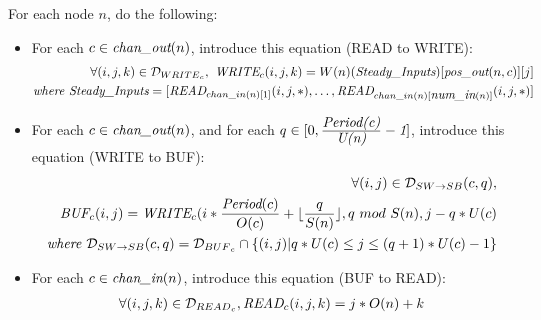 \noindent For each node $n$, do the following:
\begin{itemize}

\item For each $c \in \mbox{\it chan\_out}(n)$, introduce this equation
(READ to WRITE):
%
\begin{align*}
\forall (i, j, k) \in {\cal D}_{{WRITE}_{c}},~\mbox{\it WRITE}_{c}(i,j,k) = W(n)(\mbox{\it Steady\_Inputs})[\mbox{\it pos\_out}(n, c)][j] \\
\mbox{\it where Steady\_Inputs} = [\mbox{\it READ}_{{chan\_in}(n)[1]}(i, j, *), \dots, 
                             \mbox{\it READ}_{{chan\_in}(n)[\mbox{\it num\_in}(n)]}(i, j, *) ]
\end{align*}
%
\item For each $c \in \mbox{\it chan\_out}(n)$, and for each $q \in
[0,\frac{\mbox{\it Period(c)}}{\mbox{\it U(n)}}-\mbox{\it 1}]$,
introduce this equation (WRITE to BUF):
\begin{align*}
\forall (i,j) \in {\cal D}_{SW {\small \rightarrow} SB}(c,q), \\
\mbox{\it BUF}_{c}(i,j) = 
  \mbox{\it WRITE}_{c}(i * \frac{\mbox{\it Period}(c)}{O(c)} + \lfloor \frac{q}{S(n)} \rfloor, q~mod~S(n),
                     j - q * U(c) \\
\mbox{\it where } {\cal D}_{SW {\small \rightarrow} SB}(c,q) = 
  {\cal D}_{{BUF}_{c}} \cap 
  \{ (i,j) | q*U(c) \le j \le (q+1)*U(c) - 1 \}
\end{align*}

\item For each $c \in \mbox{\it chan\_in}(n)$, introduce this equation (BUF to
READ):
\begin{align*}
\forall (i,j,k) \in {\cal D}_{{READ}_{c}},
\mbox{\it READ}_{c}(i,j,k) = j*O(n) + k
\end{align*}
\end{itemize}

\begin{figure}[t]
\framebox[6.5in]{
\begin{minipage}{6.5in}
\end{minipage}
}
\end{figure}


